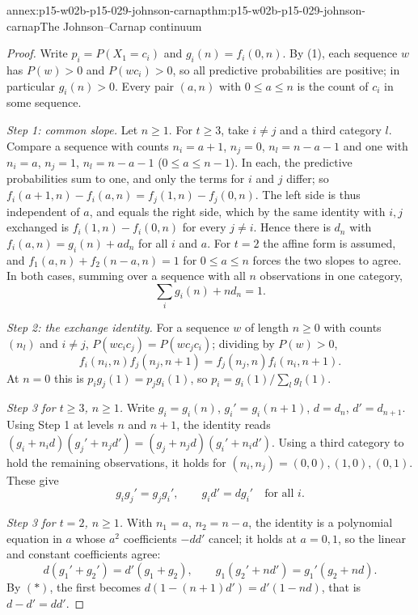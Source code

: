 \begin{annexitem}{annex:p15-w02b-p15-029-johnson-carnap}{thm:p15-w02b-p15-029-johnson-carnap}{The Johnson--Carnap continuum}
\begin{proof}
Write \(p_i=P(X_1=c_i)\) and \(g_i(n)=f_i(0,n)\). By (1), each
sequence \(w\) has \(P(w)>0\) and \(P(wc_i)>0\), so all predictive
probabilities are positive; in particular \(g_i(n)>0\). Every pair
\((a,n)\) with \(0\leq a\leq n\) is the count of \(c_i\) in some
sequence.

\emph{Step 1: common slope.} Let \(n\geq1\). For \(t\geq3\), take
\(i\ne j\) and a third category \(l\). Compare a sequence with counts
\(n_i=a+1\), \(n_j=0\), \(n_l=n-a-1\) and one with \(n_i=a\),
\(n_j=1\), \(n_l=n-a-1\) (\(0\leq a\leq n-1\)). In each, the
predictive probabilities sum to one, and only the terms for \(i\) and
\(j\) differ; so
\(f_i(a+1,n)-f_i(a,n)=f_j(1,n)-f_j(0,n)\). The left side is thus
independent of \(a\), and equals the right side, which by the same
identity with \(i,j\) exchanged is \(f_i(1,n)-f_i(0,n)\) for every
\(j\ne i\). Hence there is \(d_n\) with
\(f_i(a,n)=g_i(n)+ad_n\) for all \(i\) and \(a\). For \(t=2\) the
affine form is assumed, and
\(f_1(a,n)+f_2(n-a,n)=1\) for \(0\leq a\leq n\) forces the two slopes
to agree. In both cases, summing over a sequence with all \(n\)
observations in one category,
\[
 \textstyle\sum_ig_i(n)+nd_n=1.\tag{\(\ast\)}
\]

\emph{Step 2: the exchange identity.} For a sequence \(w\) of length
\(n\geq0\) with counts \((n_l)\) and \(i\ne j\),
\(P(wc_ic_j)=P(wc_jc_i)\); dividing by \(P(w)>0\),
\[
 f_i(n_i,n)f_j(n_j,n+1)=f_j(n_j,n)f_i(n_i,n+1).
\]
At \(n=0\) this is \(p_ig_j(1)=p_jg_i(1)\), so
\(p_i=g_i(1)/\sum_lg_l(1)\).

\emph{Step 3 for \(t\geq3\), \(n\geq1\).} Write \(g_i=g_i(n)\),
\(g_i'=g_i(n+1)\), \(d=d_n\), \(d'=d_{n+1}\). Using Step 1 at levels
\(n\) and \(n+1\), the identity reads
\((g_i+n_id)(g_j'+n_jd')=(g_j+n_jd)(g_i'+n_id')\). Using a third
category to hold the remaining observations, it holds for
\((n_i,n_j)=(0,0),(1,0),(0,1)\). These give
\[
 g_ig_j'=g_jg_i',\qquad g_id'=dg_i'\quad\text{for all }i.
\]

\emph{Step 3 for \(t=2\), \(n\geq1\).} With \(n_1=a\), \(n_2=n-a\),
the identity is a polynomial equation in \(a\) whose \(a^2\)
coefficients \(-dd'\) cancel; it holds at \(a=0,1\), so the linear and
constant coefficients agree:
\[
 d(g_1'+g_2')=d'(g_1+g_2),\qquad
 g_1(g_2'+nd')=g_1'(g_2+nd).
\]
By \((\ast)\), the first becomes \(d(1-(n+1)d')=d'(1-nd)\), that is
\(d-d'=dd'\).


\end{proof}
\end{annexitem}
